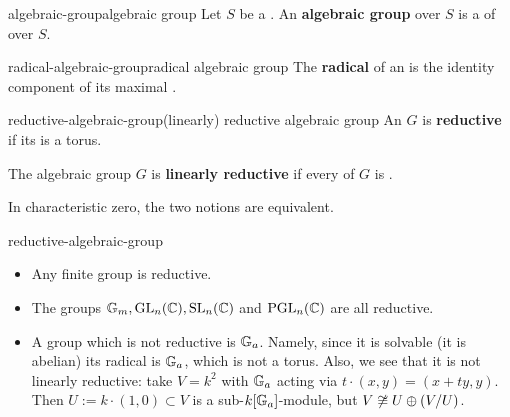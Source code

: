 \begin{topic}{algebraic-group}{algebraic group}
    Let $S$ be a . An \textbf{algebraic group} over $S$ is a  of  over $S$.
\end{topic}


\begin{topic}{radical-algebraic-group}{radical algebraic group}
    The \textbf{radical} of an  is the identity component of its maximal   .
\end{topic}

\begin{topic}{reductive-algebraic-group}{(linearly) reductive algebraic group}
    An  $G$ is \textbf{reductive} if its  is a torus.
    
    The algebraic group $G$ is \textbf{linearly reductive} if every  of $G$ is .
    
    In characteristic zero, the two notions are equivalent.
\end{topic}

\begin{example}{reductive-algebraic-group}
    \begin{itemize}
        \item Any finite group is reductive.
        \item The groups $\mathbb{G}_m, \textup{GL}_n(\mathbb{C}), \textup{SL}_n(\mathbb{C})$ and $\textup{PGL}_n(\mathbb{C})$ are all reductive. 
        \item A group which is not reductive is $\mathbb{G}_a$. Namely, since it is solvable (it is abelian) its radical is $\mathbb{G}_a$, which is not a torus. Also, we see that it is not linearly reductive: take $V = k^2$ with $\mathbb{G}_a$ acting via $t \cdot (x, y) = (x + ty, y)$. Then $U := k \cdot (1, 0) \subset V$ is a sub-$k[\mathbb{G}_a]$-module, but $V \not\cong U \oplus (V / U)$.
    \end{itemize}
\end{example}

